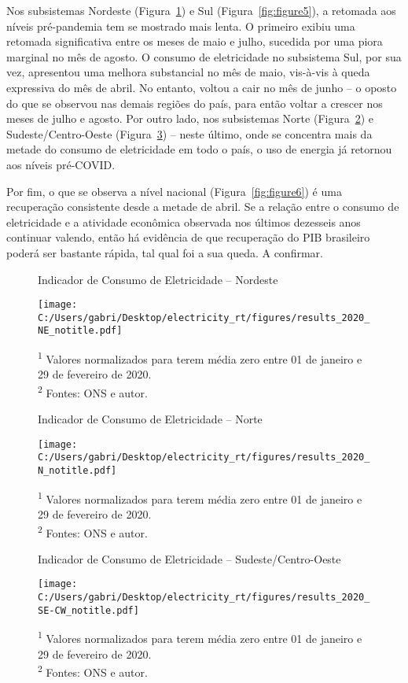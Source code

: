 \documentclass[12pt]{article}
\begin{document}
Nos subsistemas Nordeste (Figura~{\ref{fig:figure2}}) e Sul (Figura~{\ref{fig:figure5}}), a retomada aos níveis pré-pandemia tem se mostrado mais lenta. O primeiro exibiu uma retomada significativa entre os meses de maio e julho, sucedida por uma piora marginal no mês de agosto. O consumo de eletricidade no subsistema Sul, por sua vez, apresentou uma melhora substancial no mês de maio, vis-à-vis à queda expressiva do mês de abril. No entanto, voltou a cair no mês de junho -- o oposto do que se observou nas demais regiões do país, para então voltar a crescer nos meses de julho e agosto. Por outro lado, nos subsistemas Norte (Figura~{\ref{fig:figure3}}) e Sudeste/Centro-Oeste (Figura~{\ref{fig:figure4}}) -- neste último, onde se concentra mais da metade do consumo de eletricidade em todo o país, o uso de energia já retornou aos níveis pré-COVID. 

Por fim, o que se observa a nível nacional (Figura~{\ref{fig:figure6}}) é uma recuperação consistente desde a metade de abril. Se a relação entre o consumo de eletricidade e a atividade econômica observada nos últimos dezesseis anos continuar valendo, então há evidência de que recuperação do PIB brasileiro poderá ser bastante rápida, tal qual foi a sua queda. A confirmar. \vspace{5pt}

\begin{figure}[!htb]
	\centering
	\caption{Indicador de Consumo de Eletricidade -- Nordeste}
	\label{fig:figure2}
	\texttt{[image: C:/Users/gabri/Desktop/electricity\_rt/figures/results\_2020\_NE\_notitle.pdf]}
	\caption*{\textsuperscript{1} Valores normalizados para terem média zero entre 01 de janeiro e 29 de fevereiro de 2020. \\ \textsuperscript{2} Fontes: ONS e autor.}
\end{figure}

\begin{figure}[!htb]
	\centering
	\caption{Indicador de Consumo de Eletricidade -- Norte}
	\label{fig:figure3}
	\texttt{[image: C:/Users/gabri/Desktop/electricity\_rt/figures/results\_2020\_N\_notitle.pdf]}
	\caption*{\textsuperscript{1} Valores normalizados para terem média zero entre 01 de janeiro e 29 de fevereiro de 2020. \\ \textsuperscript{2} Fontes: ONS e autor.}
\end{figure}

\begin{figure}[!htb]
	\centering
	\caption{Indicador de Consumo de Eletricidade -- Sudeste/Centro-Oeste}
	\label{fig:figure4}
	\texttt{[image: C:/Users/gabri/Desktop/electricity\_rt/figures/results\_2020\_SE-CW\_notitle.pdf]}
	\caption*{\textsuperscript{1} Valores normalizados para terem média zero entre 01 de janeiro e 29 de fevereiro de 2020. \\ \textsuperscript{2} Fontes: ONS e autor.}
\end{figure}
\end{document}
